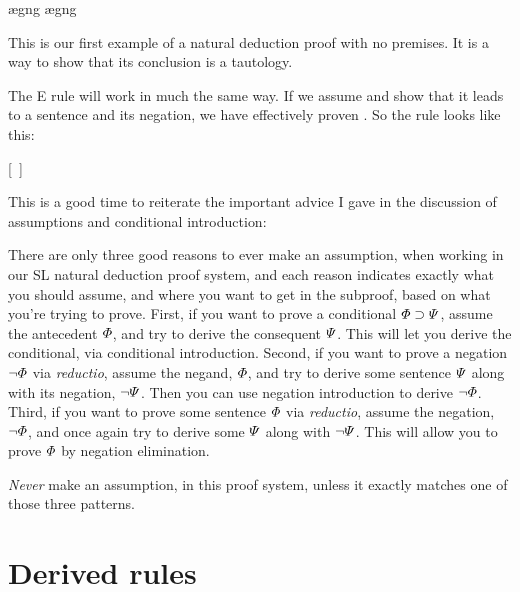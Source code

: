\begin{ndproof}
	\open
		\ae{gng}
		\ae{gng}
	\close
\end{ndproof}

This is our first example of a natural deduction proof with no premises. It is a way to show that its conclusion is a tautology.

The {\enot}E rule will work in much the same way. If we assume \enot\metaA{} and show that it leads to a sentence and its negation, we have effectively proven \metaA{}. So the rule looks like this:

\begin{ndproof}
\open
	\metaB{}
\close
{}[\ ]\metaA{}
\end{ndproof}

This is a good time to reiterate the important advice I gave in the discussion of assumptions and conditional introduction: 


There are only three good reasons to ever make an assumption, when working in our SL natural deduction proof system, and each reason indicates exactly what you should assume, and where you want to get in the subproof, based on what you're trying to prove. First, if you want to prove a conditional $\varPhi{}\supset\varPsi{}$, assume the antecedent $\varPhi{}$, and try to derive the consequent $\varPsi{}$. This will let you derive the conditional, via conditional introduction. Second, if you want to prove a negation $\neg\varPhi{}$ via \emph{reductio}, assume the negand, $\varPhi{}$, and try to derive some sentence $\varPsi{}$ along with its negation, $\neg\varPsi{}$. Then you can use negation introduction to derive $\neg\varPhi{}$. Third, if you want to prove some sentence $\varPhi{}$ via \emph{reductio}, assume the negation, $\neg\varPhi{}$, and once again try to derive some $\varPsi{}$ along with $\neg\varPsi{}$. This will allow you to prove $\varPhi{}$ by negation elimination.

\emph{Never} make an assumption, in this proof system, unless it exactly matches one of those three patterns.

\section{Derived rules}


